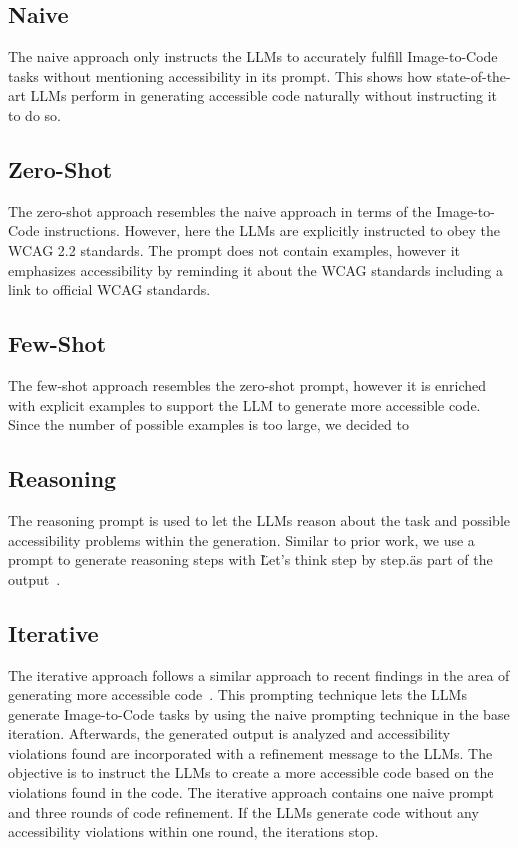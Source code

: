 \subsection{Naive}
The naive approach only instructs the LLMs to accurately fulfill Image-to-Code tasks
without mentioning accessibility in its prompt. This shows how state-of-the-art 
LLMs perform in generating accessible code naturally without instructing it to 
do so.

\subsection{Zero-Shot}
The zero-shot approach resembles the naive approach in terms of the Image-to-Code
instructions. However, here the LLMs are explicitly instructed to obey the WCAG 
2.2 standards. The prompt does not contain examples, however it emphasizes 
accessibility by reminding it about the WCAG standards including a link to 
official WCAG standards.

\subsection{Few-Shot}
The few-shot approach resembles the zero-shot prompt, however it is enriched with 
explicit examples to support the LLM to generate more accessible code.
Since the number of possible examples is too large, we decided to 

\subsection{Reasoning}
The reasoning prompt is used to let the LLMs reason about the task and possible 
accessibility problems within the generation. Similar to prior work, we use 
a prompt to generate reasoning steps with \"Let’s think step by 
step.\" as part of the output~\parencite{chae2024thinkexecute}.

\subsection{Iterative}
The iterative approach follows a similar approach to recent findings in the area
of generating more accessible code~\parencite{suh2025accessiblecode}. This 
prompting technique lets the LLMs generate Image-to-Code tasks by using the naive 
prompting technique in the base iteration. Afterwards, the generated output is 
analyzed and accessibility violations found are incorporated with a refinement 
message to the LLMs. The objective is to instruct the LLMs to create a more 
accessible code based on the violations found in the code. The iterative approach 
contains one naive prompt and three rounds of code refinement. If the LLMs 
generate code without any accessibility violations within one round, the 
iterations stop.


